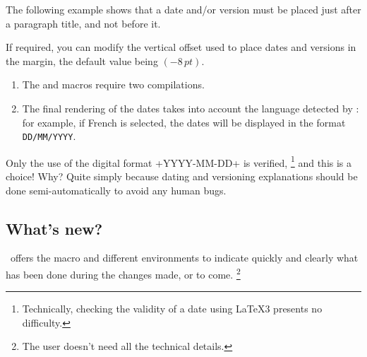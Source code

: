 \begin{tdocexa}
	The following example shows that a date and/or version must be placed just after a paragraph title, and not before it.


\end{tdocexa}


\begin{tdocexa}
	If required, you can modify the vertical offset used to place dates and versions in the margin, the default value being $(-8\,\mathit{pt})$.


\end{tdocexa}


\begin{tdocimp}
    \begin{enumerate}[wide]
        \item The  and  macros require two compilations.

        \item The final rendering of the dates takes into account the language detected by \thisproj{}: for example, if French is selected, the dates will be displayed in the format \texttt{DD/MM/YYYY}.
    \end{enumerate}
\end{tdocimp}


\begin{tdoccaut}
    Only the use of the digital format \tdoclatexin+YYYY-MM-DD+ is verified,
    \footnote{
        Technically, checking the validity of a date using \LaTeX3 presents no difficulty.
    }
    and this is a choice! Why? Quite simply because dating and versioning explanations should be done semi-automatically to avoid any human bugs.
\end{tdoccaut}


\subsection{What's new?}

\thisproj\ offers the macro  and different environments to indicate quickly and clearly what has been done during the changes made, or to come.%
\footnote{
    The user doesn't need all the technical details.
}


